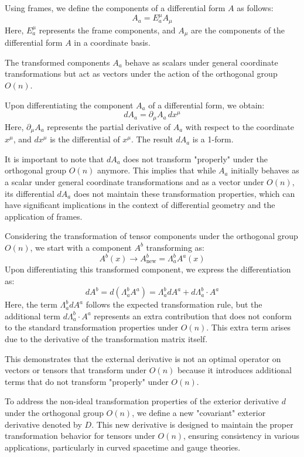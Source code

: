 \documentclass{article}
\begin{document}
Using frames, we define the components of a differential form \(A\) as follows:
\[
A_a = E_a^\mu A_\mu
\]
Here, \(E_a^\mu\) represents the frame components, and \(A_\mu\) are the components of the differential form \(A\) in a coordinate basis. 

The transformed components \(A_a\) behave as scalars under general coordinate transformations but act as vectors under the action of the orthogonal group \(O(n)\). 

Upon differentiating the component \(A_a\) of a differential form, we obtain:
\[
dA_a = \partial_\mu A_a \, dx^\mu
\]
Here, \(\partial_\mu A_a\) represents the partial derivative of \(A_a\) with respect to the coordinate \(x^\mu\), and \(dx^\mu\) is the differential of \(x^\mu\). The result \(dA_a\) is a 1-form.

It is important to note that \(dA_a\) does not transform "properly" under the orthogonal group \(O(n)\) anymore. This implies that while \(A_a\) initially behaves as a scalar under general coordinate transformations and as a vector under \(O(n)\), its differential \(dA_a\) does not maintain these transformation properties, which can have significant implications in the context of differential geometry and the application of frames.

Considering the transformation of tensor components under the orthogonal group \(O(n)\), we start with a component \(A^b\) transforming as:
\[
A^b(x) \rightarrow A^b_{\text{new}} = \Lambda^b_a A^a(x)
\]
Upon differentiating this transformed component, we express the differentiation as:
\[
dA^b = d(\Lambda^b_a A^a) = \Lambda^b_a dA^a + d\Lambda^b_a \cdot A^a
\]
Here, the term \(\Lambda^b_a dA^a\) follows the expected transformation rule, but the additional term \(d\Lambda^b_a \cdot A^a\) represents an extra contribution that does not conform to the standard transformation properties under \(O(n)\). This extra term arises due to the derivative of the transformation matrix itself.

This demonstrates that the external derivative is not an optimal operator on vectors or tensors that transform under \(O(n)\) because it introduces additional terms that do not transform "properly" under \(O(n)\). 

To address the non-ideal transformation properties of the exterior derivative \(d\) under the orthogonal group \(O(n)\), we define a new "covariant" exterior derivative denoted by \(D\). This new derivative is designed to maintain the proper transformation behavior for tensors under \(O(n)\), ensuring consistency in various applications, particularly in curved spacetime and gauge theories. 
\end{document}
